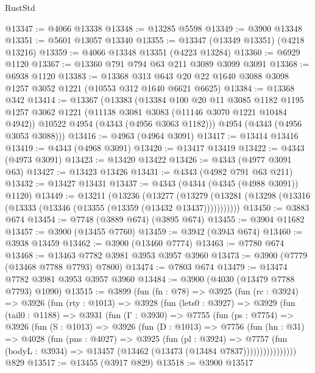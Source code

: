 \begin{lexlean}{RustStd}
\begin{coremodule}
@13347 := @4066 @13338
@13348 := @13285 @5598
@13349 := @3900 @13348
@13351 := @5601 @13057 @13340
@13355 := @13347 (@13349 @13351) (@4218 @13216)
@13359 := @4066 @13348 @13351 (@4223 @13284)
@13360 := @6929 @1120
@13367 := @13360 @791 @794 @63 @211 @3089 @3099 @3091
@13368 := @6938 @1120
@13383 := @13368
    @313
    @643
    @20
    @22
    @1640
    @3088
    @3098
    @1257
    @3052
    @1221
    (@10553 @312 @1640 @6621 @6625)
@13384 := @13368 @342
@13414 := @13367
    (@13383
      (@13384
        @100
        @20
        @11
        @3085
        @1182
        @1195
        @1257
        @3062
        @1221
        (@11138 @3081 @3083 (@11146 @3070 @1221 @10484 @4942))
        @10522
        @4954
        (@4343 (@4956 @3063 @1182)))
      @4954
      (@4343 (@4956 @3053 @3088)))
@13416 := @4963 (@4964 @3091)
@13417 := @13414 @13416
@13419 := @4343 (@4968 @3091)
@13420 := @13417 @13419
@13422 := @4343 (@4973 @3091)
@13423 := @13420 @13422
@13426 := @4343 (@4977 @3091 @63)
@13427 := @13423 @13426
@13431 := @4343 (@4982 @791 @63 @211)
@13432 := @13427 @13431
@13437 := @4343 (@4344 (@4345 (@4988 @3091)) @1120)
@13449 := @13211
    (@13236
      (@13277
        (@13279 (@13281 (@13298 (@13316 (@13333 (@13346 (@13355 (@13359 (@13432 @13437)))))))))))
@13450 := @3883 @674
@13454 := @7748 (@3889 @674) (@3895 @674)
@13455 := @3904 @11682
@13457 := @3900 (@13455 @7760)
@13459 := @3942 (@3943 @674)
@13460 := @3938 @13459
@13462 := @3900 (@13460 @7774)
@13463 := @7780 @674
@13468 := @13463 @7782 @3981 @3953 @3957 @3960
@13473 := @3900 (@7779 (@13468 @7788 @7793) @7800)
@13474 := @7803 @674
@13479 := @13474 @7782 @3981 @3953 @3957 @3960
@13484 := @3900 (@4030 (@13479 @7788 @7793) @1090)
@13515 := @3899
    (fun (fn : @78) =>
    @3925
      (fun (rc : @3924) =>
      @3926
        (fun (rty : @1013) =>
        @3928
          (fun (lets0 : @3927) =>
          @3929
            (fun (tail0 : @1188) =>
            @3931
              (fun (Γ : @3930) =>
              @7755
                (fun (ps : @7754) =>
                @3926
                  (fun (S : @1013) =>
                  @3926
                    (fun (D : @1013) =>
                    @7756
                      (fun (hn : @31) =>
                      @4028
                        (fun (pns : @4027) =>
                        @3925
                          (fun (pl : @3924) =>
                          @7757
                            (fun (bodyL : @3934) =>
                            @13457 (@13462 (@13473 (@13484 @7837))))))))))))))))
    @829
@13517 := @13455 (@3917 @829)
@13518 := @3900 @13517

\end{coremodule}
\end{lexlean}
